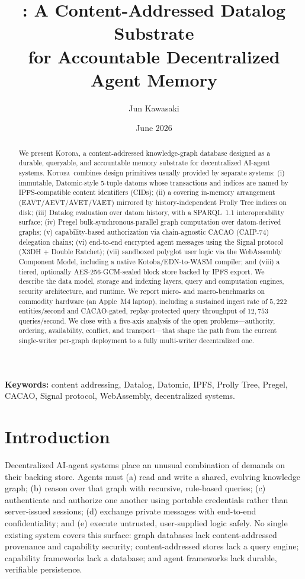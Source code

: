\documentclass[11pt]{article}
\title{\textbf{\kotoba: A Content-Addressed Datalog Substrate\\
for Accountable Decentralized Agent Memory}}
\author[1]{Jun Kawasaki}
\affil[1]{com-junkawasaki / etzhayyim}
\date{June 2026}
\newcommand{\kotoba}{\textsc{Kotoba}}
\newcommand{\cid}{\textsf{CID}}
\begin{document}
\maketitle

\begin{abstract}
We present \kotoba, a content-addressed knowledge-graph database designed as a
durable, queryable, and accountable memory substrate for decentralized AI-agent
systems. \kotoba\ combines design primitives usually provided by separate
systems: (i) immutable, Datomic-style 5-tuple datoms whose transactions and
indices are named by IPFS-compatible content identifiers (\cid{}s); (ii) a
covering in-memory arrangement (EAVT/AEVT/AVET/VAET) mirrored by
history-independent Prolly Tree indices on disk; (iii) Datalog evaluation over
datom history, with a SPARQL~1.1 interoperability surface; (iv) Pregel
bulk-synchronous-parallel graph computation over datom-derived graphs; (v)
capability-based authorization via chain-agnostic CACAO (CAIP-74) delegation
chains; (vi) end-to-end encrypted agent messages using the Signal protocol
(X3DH + Double Ratchet); (vii) sandboxed polyglot user logic via the
WebAssembly Component Model, including a native Kotoba/EDN-to-WASM compiler;
and (viii) a tiered, optionally AES-256-GCM-sealed block store backed by IPFS
export. We describe the data model, storage and indexing layers, query and
computation engines, security architecture, and runtime. We report micro- and
macro-benchmarks on commodity hardware (an Apple~M4 laptop), including a
sustained ingest rate of $5{,}222$ entities/second and CACAO-gated,
replay-protected query throughput of $12{,}753$ queries/second. We close with a
five-axis analysis of the open problems---authority, ordering, availability,
conflict, and transport---that shape the path from the current single-writer
per-graph deployment to a fully multi-writer decentralized one.
\end{abstract}

\noindent\textbf{Keywords:} content addressing, Datalog, Datomic, IPFS, Prolly
Tree, Pregel, CACAO, Signal protocol, WebAssembly, decentralized systems.

\section{Introduction}
\label{sec:intro}

Decentralized AI-agent systems place an unusual combination of demands on their
backing store. Agents must (a) read and write a shared, evolving knowledge graph;
(b) reason over that graph with recursive, rule-based queries; (c) authenticate
and authorize one another using portable credentials rather than server-issued
sessions; (d) exchange private messages with end-to-end confidentiality; and
(e) execute untrusted, user-supplied logic safely. No single existing system
covers this surface: graph databases lack content-addressed provenance and
capability security; content-addressed stores lack a query engine; capability
frameworks lack a database; and agent frameworks lack durable, verifiable
persistence.
\end{document}
